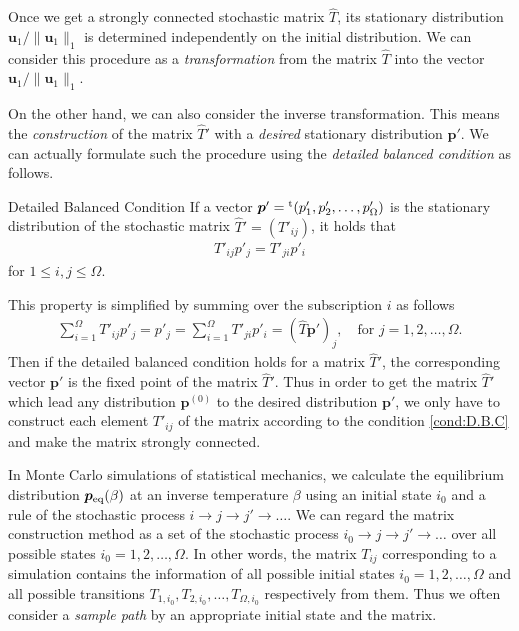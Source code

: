 Once we get a strongly connected stochastic matrix $\hat{T}$, its stationary distribution $\bm{u}_{1}/\|\bm{u}_{1}\|_{1}$ is determined independently on the initial distribution. We can consider this procedure as a \textit{transformation} from the matrix $\hat{T}$ into the vector $\bm{u}_{1}/\|\bm{u}_{1}\|_{1}$. 

On the other hand, we can also consider the inverse transformation. This means the \textit{construction} of the matrix $\hat{T}'$ with a \textit{desired} stationary distribution $\bm{p}'$. We can actually formulate such the procedure using the \textit{detailed balanced condition} as follows.
\begin{itembox}{Detailed Balanced Condition}
If a vector $\bm{p}'={}^{\rm t}(p'_{1},p'_{2},\dots,p'_{\Omega})$ is the stationary distribution of the stochastic matrix $\hat{T}'=\left(T'_{ij}\right)$, it holds that
\begin{align}
T'_{ij}p'_{j} = T'_{ji}p'_{i}\label{cond:D.B.C}
\end{align}
for $1\leq i,j\leq \Omega$.
\end{itembox}
This property is simplified by summing over the subscription $i$ as follows
\begin{align}
\sum_{i=1}^{\Omega}T'_{ij}p'_{j} = p'_{j} = \sum_{i=1}^{\Omega}T'_{ji}p'_{i} = \left(\hat{T}\bm{p}'\right)_{j},\quad\text{for $j=1,2,\dots,\Omega$}.
\end{align}
Then if the detailed balanced condition holds for a matrix $\hat{T}'$, the corresponding vector $\bm{p}'$ is the fixed point of the matrix $\hat{T}'$. Thus in order to get the matrix $\hat{T}'$ which lead any distribution $\bm{p}^{(0)}$ to the desired distribution $\bm{p}'$, we only have to construct each element $T'_{ij}$ of the matrix according to the condition \eqref{cond:D.B.C} and make the matrix strongly connected.

In Monte Carlo simulations of statistical mechanics, we calculate the equilibrium distribution $\bm{p}_{\rm eq}(\beta)$ at an inverse temperature $\beta$ using an initial state $i_{0}$ and a rule of the stochastic process $i\to j\to j'\to\dots$. We can regard the matrix construction method as a set of the stochastic process $i_{0}\to j\to j'\to\dots$ over all possible states $i_{0}=1,2,\dots,\Omega$. In other words, the matrix $T_{ij}$ corresponding to a simulation contains the information of all possible initial states $i_{0}=1,2,\dots,\Omega$ and all possible transitions $T_{1,i_{0}},T_{2,i_{0}},\dots,T_{\Omega,i_{0}}$ respectively from them. Thus we often consider a \textit{sample path} by an appropriate initial state and the matrix.

